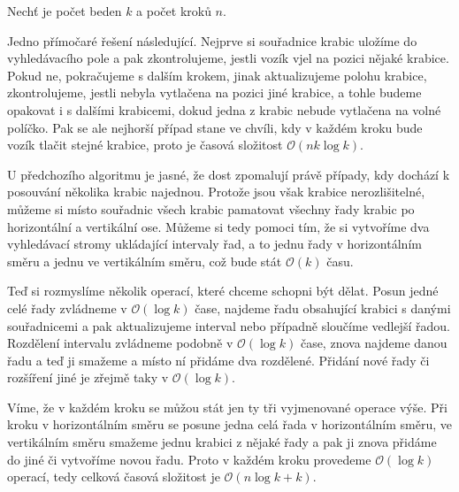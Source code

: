 \documentclass{fkssolpub}
\author{Ondřej Sedláček}
\begin{document}
Nechť je počet beden $k$ a počet kroků $n$.

Jedno přímočaré řešení následující. Nejprve si souřadnice krabic uložíme do
vyhledávacího pole a pak zkontrolujeme, jestli vozík vjel na pozici
nějaké krabice. Pokud ne, pokračujeme s dalším krokem, jinak aktualizujeme
polohu krabice, zkontrolujeme, jestli nebyla vytlačena na pozici jiné krabice,
a tohle budeme opakovat i s dalšími krabicemi, dokud jedna z krabic
nebude vytlačena na volné políčko. Pak se ale nejhorší případ stane
ve chvíli, kdy v každém kroku bude vozík tlačit stejné krabice, proto
je časová složitost $\mathcal{O}(n k \log k)$.

U předchozího algoritmu je jasné, že dost zpomalují právě případy, kdy
dochází k posouvání několika krabic najednou. Protože jsou však krabice
nerozlišitelné, můžeme si místo souřadnic všech krabic pamatovat všechny
řady krabic po horizontální a vertikální ose. Můžeme si tedy pomoci tím, že
si vytvoříme dva vyhledávací stromy ukládající intervaly řad, a to jednu řady
v horizontálním směru a jednu ve vertikálním směru, což bude stát $\mathcal{O}(k)$
času.

Teď si rozmyslíme několik operací, které chceme schopni být dělat. Posun jedné
celé řady zvládneme v $\mathcal{O}(\log k)$ čase, najdeme řadu obsahující krabici s danými
souřadnicemi a pak aktualizujeme interval nebo případně sloučíme vedlejší řadou.
Rozdělení intervalu zvládneme podobně v $\mathcal{O}(\log k)$ čase, znova najdeme
danou řadu a teď ji smažeme a místo ní přidáme dva rozdělené. Přidání nové
řady či rozšíření jiné je zřejmě taky v $\mathcal{O}(\log k)$.

Víme, že v každém kroku se můžou stát jen ty tři vyjmenované operace výše. Při kroku
v horizontálním směru se posune jedna celá řada v horizontálním směru, ve vertikálním
směru smažeme jednu krabici z nějaké řady a pak ji znova přidáme do jiné či vytvoříme
novou řadu. Proto v každém kroku provedeme $\mathcal{O}(\log k)$ operací, tedy
celková časová složitost je $\mathcal{O}(n \log k + k)$.
\end{document}

